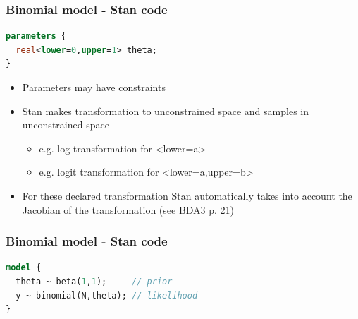 \documentclass[10pt,handout]{beamer}
\begin{document}
\begin{frame}[fragile]

\frametitle{Binomial model - Stan code}

  {\small
\begin{lstlisting}[language=Stan]
parameters {
  real<lower=0,upper=1> theta;
}
\end{lstlisting}}

  \begin{itemize}
  \item Parameters may have constraints
  \item Stan makes transformation to unconstrained space and samples in unconstrained space
    \begin{itemize}
    \item e.g. log transformation for <lower=a>
    \item e.g. logit transformation for <lower=a,upper=b>
    \end{itemize}
  \item<2-> For these declared transformation Stan automatically takes
    into account the Jacobian of the transformation (see BDA3 p. 21)
  \end{itemize}
\end{frame}

\begin{frame}[fragile]

\frametitle{Binomial model - Stan code}

  {\small
\begin{lstlisting}[language=Stan]
model {
  theta ~ beta(1,1);     // prior
  y ~ binomial(N,theta); // likelihood
}
\end{lstlisting}}

\end{frame}
\end{document}
